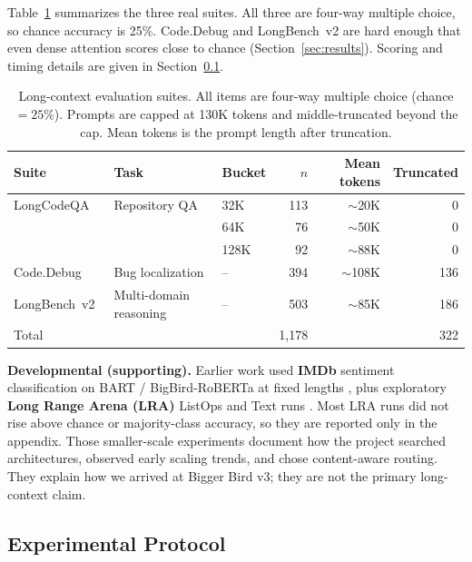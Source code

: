 \documentclass[11pt]{article}
\begin{document}
Table~\ref{tab:suites} summarizes the three real suites. All three are
four-way multiple choice, so chance accuracy is 25\%. Code.Debug and
LongBench~v2 are hard enough that even dense attention scores close to
chance (Section~\ref{sec:results}). Scoring and timing details are given in
Section~\ref{sec:protocol}.

\begin{table}[ht]
  \centering
  \small
  \caption{Long-context evaluation suites. All items are four-way multiple
    choice (chance $=25\%$). Prompts are capped at 130K tokens and
    middle-truncated beyond the cap. Mean tokens is the prompt length
    after truncation.}
  \label{tab:suites}
  \begin{tabular}{@{}lllrrr@{}}
    \toprule
    Suite & Task & Bucket & $n$ & Mean tokens & Truncated \\
    \midrule
    LongCodeQA~\citep{rando2025longcodebenchevaluatingcodingllms}
      & Repository QA & 32K  & 113 & $\sim$20K  & 0 \\
      &               & 64K  & 76  & $\sim$50K  & 0 \\
      &               & 128K & 92  & $\sim$88K  & 0 \\
    Code.Debug~\citep{zhang-etal-2024-bench}
      & Bug localization & -- & 394 & $\sim$108K & 136 \\
    LongBench~v2~\citep{bai-etal-2025-longbench}
      & Multi-domain reasoning & -- & 503 & $\sim$85K  & 186 \\
    \midrule
    Total & & & 1{,}178 & & 322 \\
    \bottomrule
  \end{tabular}
\end{table}

\textbf{Developmental (supporting).} Earlier work used \textbf{IMDb}
sentiment classification on BART / BigBird-RoBERTa at fixed lengths
\citep{maas2011imdb}, plus exploratory \textbf{Long Range Arena (LRA)}
ListOps and Text runs \citep{tay2021lra}. Most LRA runs did not rise above
chance or majority-class accuracy, so they are reported only in the appendix.
Those smaller-scale experiments document how the project searched
architectures, observed early scaling trends, and chose content-aware
routing. They explain how we arrived at Bigger Bird v3; they are not the
primary long-context claim.

\subsection{Experimental Protocol}
\label{sec:protocol}
\end{document}
